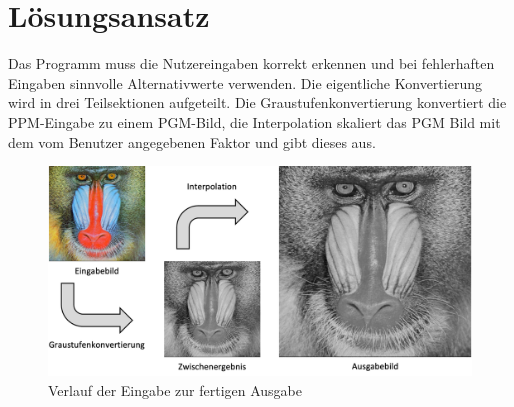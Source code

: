 \documentclass[course=erap]{aspdoc}
\begin{document}
\section{Lösungsansatz}
Das Programm muss die Nutzereingaben korrekt erkennen und bei fehlerhaften Eingaben sinnvolle Alternativwerte verwenden.
Die eigentliche Konvertierung wird in drei Teilsektionen aufgeteilt. Die Graustufenkonvertierung konvertiert die PPM-Eingabe zu einem PGM-Bild, die Interpolation skaliert das PGM Bild mit dem vom Benutzer angegebenen Faktor und gibt dieses aus.

\begin{figure}[h]
    \centering
    \includegraphics[scale=0.8]{Ausarbeitung/assets/verlauf.png}
    \caption{Verlauf der Eingabe zur fertigen Ausgabe}
    \label{fig:verlauf}
\end{figure}
\end{document}
